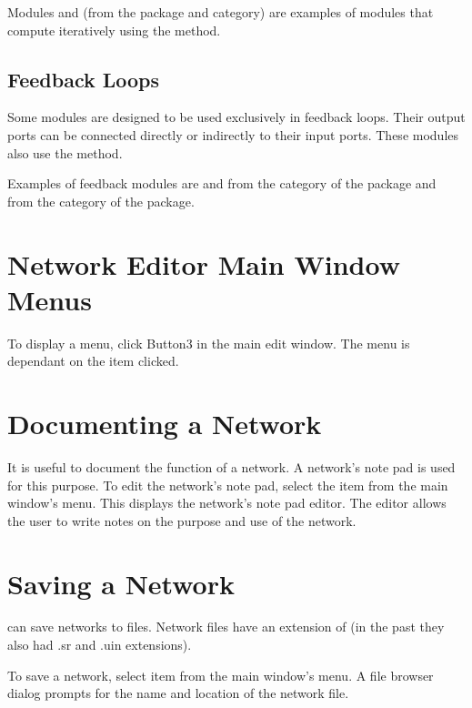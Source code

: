 Modules  and  (from the
\package{\sr} package and  category) are examples of modules
that compute iteratively using the  method.

\subsection{Feedback Loops}

Some modules are designed to be used exclusively in feedback
loops. Their output ports can be connected
directly or indirectly to their input ports.  These modules also use the
 method.

Examples of feedback modules are  and
 from the  category of the
 package and  from the
 category of the  package.

\section{Network Editor Main Window Menus}
\label{sec:netrworkmenus}

To display a menu, click Button3 in the main edit
window. The menu is dependant on the item clicked.

\section{Documenting a Network}
\label{sec:docnetwork}

It is useful to document the function of a network.  A network's note
pad is used for this purpose.  To edit the network's note pad,
select the  item from the main window's 
menu.  This displays the network's note pad editor.  The editor
allows the user to write notes on the purpose and use of the network.

\section{Saving a Network}
\label{sec:savenet}

\sr{} can save networks to files.  Network files have an extension of
 (in the past they also had .sr and .uin
extensions).  

To save a network, select  item from the main window's
 menu.  A file browser dialog prompts for the
name and location of the network file.

